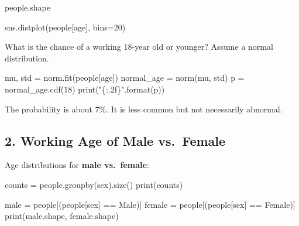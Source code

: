 \documentclass[
  letterpaper,
]{scrbook}
\newenvironment{Shaded}{\begin{snugshade}}{\end{snugshade}}
\newcommand{\BuiltInTok}[1]{\textcolor[rgb]{0.00,0.23,0.31}{#1}}
\newcommand{\DecValTok}[1]{\textcolor[rgb]{0.68,0.00,0.00}{#1}}
\newcommand{\NormalTok}[1]{\textcolor[rgb]{0.00,0.23,0.31}{#1}}
\newcommand{\OperatorTok}[1]{\textcolor[rgb]{0.37,0.37,0.37}{#1}}
\newcommand{\SpecialCharTok}[1]{\textcolor[rgb]{0.37,0.37,0.37}{#1}}
\newcommand{\StringTok}[1]{\textcolor[rgb]{0.13,0.47,0.30}{#1}}
\begin{document}
\begin{Shaded}
\begin{Highlighting}[]
\NormalTok{people.shape}
\end{Highlighting}
\end{Shaded}

\begin{Shaded}
\begin{Highlighting}[]
\NormalTok{sns.distplot(people[}\StringTok{\textquotesingle{}age\textquotesingle{}}\NormalTok{], bins}\OperatorTok{=}\DecValTok{20}\NormalTok{)}
\end{Highlighting}
\end{Shaded}

What is the chance of a working 18-year old or younger? Assume a normal
distribution.

\begin{Shaded}
\begin{Highlighting}[]
\NormalTok{mu, std }\OperatorTok{=}\NormalTok{ norm.fit(people[}\StringTok{\textquotesingle{}age\textquotesingle{}}\NormalTok{])}
\NormalTok{normal\_age }\OperatorTok{=}\NormalTok{ norm(mu, std)}
\NormalTok{p }\OperatorTok{=}\NormalTok{ normal\_age.cdf(}\DecValTok{18}\NormalTok{)}
\BuiltInTok{print}\NormalTok{(}\StringTok{"}\SpecialCharTok{\{:.2f\}}\StringTok{"}\NormalTok{.}\BuiltInTok{format}\NormalTok{(p))}
\end{Highlighting}
\end{Shaded}

The probability is about \(7\%\). It is less common but not necessarily
abnormal.

\subsection*{2. Working Age of Male
vs.~Female}\label{working-age-of-male-vs.-female}

Age distributions for \textbf{male vs.~female}:

\begin{Shaded}
\begin{Highlighting}[]
\NormalTok{counts }\OperatorTok{=}\NormalTok{ people.groupby(}\StringTok{\textquotesingle{}sex\textquotesingle{}}\NormalTok{).size()}
\BuiltInTok{print}\NormalTok{(counts)}
\end{Highlighting}
\end{Shaded}

\begin{Shaded}
\begin{Highlighting}[]
\NormalTok{male }\OperatorTok{=}\NormalTok{ people[(people[}\StringTok{\textquotesingle{}sex\textquotesingle{}}\NormalTok{] }\OperatorTok{==} \StringTok{\textquotesingle{}Male\textquotesingle{}}\NormalTok{)]}
\NormalTok{female }\OperatorTok{=}\NormalTok{ people[(people[}\StringTok{\textquotesingle{}sex\textquotesingle{}}\NormalTok{] }\OperatorTok{==} \StringTok{\textquotesingle{}Female\textquotesingle{}}\NormalTok{)]}
\BuiltInTok{print}\NormalTok{(male.shape, female.shape)}
\end{Highlighting}
\end{Shaded}
\end{document}
